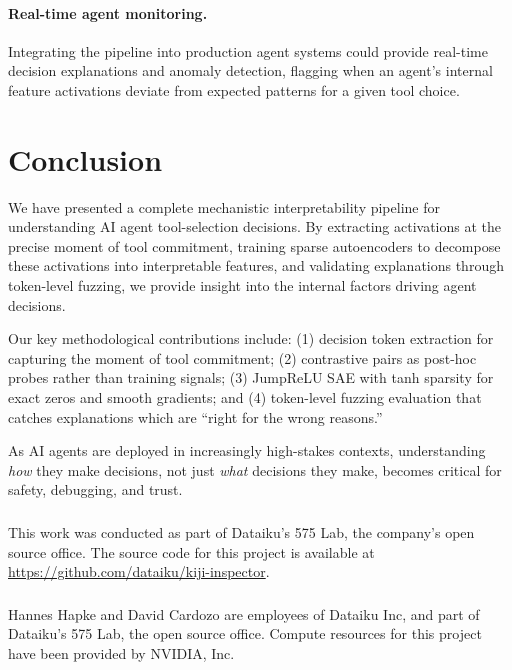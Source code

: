 \documentclass[runningheads]{llncs}
\begin{document}
\paragraph{Real-time agent monitoring.} Integrating the pipeline into production agent systems could provide real-time decision explanations and anomaly detection, flagging when an agent's internal feature activations deviate from expected patterns for a given tool choice.


\section{Conclusion}
\label{sec:conclusion}

We have presented a complete mechanistic interpretability pipeline for understanding AI agent tool-selection decisions. By extracting activations at the precise moment of tool commitment, training sparse autoencoders to decompose these activations into interpretable features, and validating explanations through token-level fuzzing, we provide insight into the internal factors driving agent decisions.

Our key methodological contributions include: (1) decision token extraction for capturing the moment of tool commitment; (2) contrastive pairs as post-hoc probes rather than training signals; (3) JumpReLU SAE with tanh sparsity for exact zeros and smooth gradients; and (4) token-level fuzzing evaluation that catches explanations which are ``right for the wrong reasons.''

As AI agents are deployed in increasingly high-stakes contexts, understanding \emph{how} they make decisions, not just \emph{what} decisions they make, becomes critical for safety, debugging, and trust.


\begin{credits}
\subsubsection{\ackname}
This work was conducted as part of Dataiku's 575 Lab, the company's open source office.
The source code for this project is available at \url{https://github.com/dataiku/kiji-inspector}.

\subsubsection{\discintname}
Hannes Hapke and David Cardozo are employees of Dataiku Inc, and part of Dataiku's 575 Lab, the open source office. Compute resources for this project have been provided by NVIDIA, Inc.
\end{credits}



\end{document}
